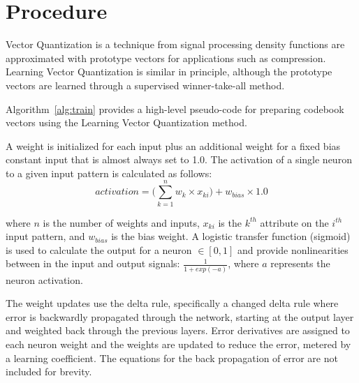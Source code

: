 \documentclass[a4paper, 11pt]{article}
\begin{document}
\section{Procedure}
\label{sec:procedure}
Vector Quantization is a technique from signal processing density functions are approximated with prototype vectors for applications such as compression. Learning Vector Quantization is similar in principle, although the prototype vectors are learned through a supervised winner-take-all method.

Algorithm~\ref{alg:train} provides a high-level pseudo-code for preparing codebook vectors using the Learning Vector Quantization method. 

A weight is initialized for each input plus an additional weight for a fixed bias constant input that is almost always set to 1.0. The activation of a single neuron to a given input pattern is calculated as follows:
\begin{equation}
	activation = \bigg(\sum_{k=1}^{n} w_{k} \times x_{ki}\bigg) + w_{bias} \times 1.0
\end{equation}

where $n$ is the number of weights and inputs, $x_{ki}$ is the $k^{th}$ attribute on the $i^{th}$ input pattern, and $w_{bias}$ is the bias weight. A logistic transfer function (sigmoid) is used to calculate the output for a neuron $\in [0,1]$ and provide nonlinearities between in the input and output signals: $\frac{1}{1+exp(-a)}$, where $a$ represents the neuron activation. 

The weight updates use the delta rule, specifically a changed delta rule where error is backwardly propagated through the network, starting at the output layer and weighted back through the previous layers. Error derivatives are assigned to each neuron weight and the weights are updated to reduce the error, metered by a learning coefficient. The equations for the back propagation of error are not included for brevity.
\end{document}
